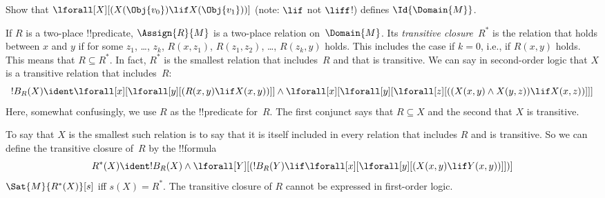 \documentclass[../../../include/open-logic-section]{subfiles}
\begin{document}
\begin{prob}
Show that $\lforall[X][(X(\Obj{v_0}) \lif X(\Obj{v_1}))]$ (note:
$\lif$ not $\liff$!) defines $\Id{\Domain{M}}$.
\end{prob}

\begin{ex}
If $R$ is a two-place !!{predicate}, $\Assign{R}{M}$ is a two-place
relation on~$\Domain{M}$.  Its \emph{transitive closure}~$R^*$ is the
relation that holds between $x$ and $y$ if for some $z_1$, \dots,
$z_k$, $R(x,z_1)$, $R(z_1, z_2)$, \dots, $R(z_k,y)$ holds. This
includes the case if $k = 0$, i.e., if $R(x,y)$ holds. This means that
$R \subseteq R^*$. In fact, $R^*$ is the smallest relation that
includes~$R$ and that is transitive.  We can say in second-order logic
that $X$ is a transitive relation that includes~$R$:
\[
!B_R(X) \ident \lforall[x][\lforall[y][(R(x,y) \lif X(x, y))]] \land
\lforall[x][\lforall[y][\lforall[z][((X(x,y) \land X(y,z)) \lif X(x,
      z))]]]
\]
Here, somewhat confusingly, we use $R$ as the !!{predicate}
for~$R$. The first conjunct says that $R \subseteq X$ and the second
that $X$ is transitive.

To say that $X$ is the smallest such relation is to say that it is
itself included in every relation that includes $R$ and is
transitive. So we can define the transitive closure of~$R$ by the
!!{formula}
\[
R^*(X) \ident !B_R(X) \land \lforall[Y][(!B_R(Y) \lif
  \lforall[x][\lforall[y][(X(x, y) \lif Y(x,y))]])]
\]
$\Sat{M}{R^*(X)}[s]$ iff $s(X) = R^*$. The transitive closure of $R$
cannot be expressed in first-order logic.
\end{ex}
\end{document}
